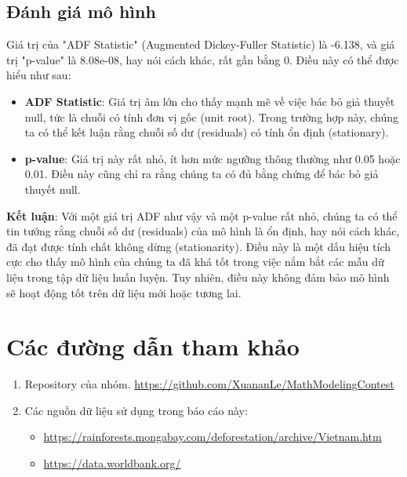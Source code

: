 \documentclass[a4paper,12pt]{report}
\begin{document}
\section{Đánh giá mô hình} %
\label{sec:đánh_giá_mô_hình}
\begin{flushleft}
	Giá trị của "ADF Statistic" (Augmented Dickey-Fuller Statistic) là -6.138, và giá trị "p-value" là 8.08e-08, hay nói cách khác, rất gần bằng 0. Điều này có thể được hiểu như sau:
	\begin{itemize}
		\item \textbf{ADF Statistic}: Giá trị âm lớn cho thấy mạnh mẽ về việc bác bỏ giả thuyết null, tức là chuỗi có tính đơn vị gốc (unit root). Trong trường hợp này, chúng ta có thể kết luận rằng chuỗi số dư (residuals) có tính ổn định (stationary).

		\item \textbf{p-value}: Giá trị này rất nhỏ, ít hơn mức ngưỡng thông thường như 0.05 hoặc 0.01. Điều này cũng chỉ ra rằng chúng ta có đủ bằng chứng để bác bỏ giả thuyết null.
	\end{itemize}

	\textbf{Kết luận}: Với một giá trị ADF như vậy và một p-value rất nhỏ, chúng ta có thể tin tưởng rằng chuỗi số dư (residuals) của mô hình là ổn định, hay nói cách khác, đã đạt được tính chất không dừng (stationarity). Điều này là một dấu hiệu tích cực cho thấy mô hình của chúng ta đã khá tốt trong việc nắm bắt các mẫu dữ liệu trong tập dữ liệu huấn luyện. Tuy nhiên, điều này không đảm bảo mô hình sẽ hoạt động tốt trên dữ liệu mới hoặc tương lai.

\end{flushleft}



\chapter*{Các đường dẫn tham khảo} %
\begin{flushleft}
	\begin{enumerate}
		\item Repository của nhóm. \url{https://github.com/XuananLe/MathModelingContest}

		\item Các nguồn dữ liệu sử dụng trong báo cáo này:
		\begin{itemize}
			\item \url{https://rainforests.mongabay.com/deforestation/archive/Vietnam.htm}

			\item \url{https://data.worldbank.org/}
		\end{itemize}
	\end{enumerate}
\end{flushleft}
\end{document}
